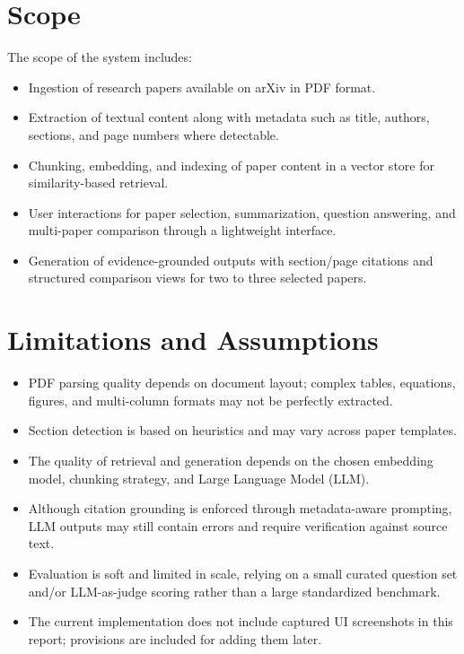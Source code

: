 \section{Scope}
The scope of the system includes:
\begin{itemize}
    \item Ingestion of research papers available on arXiv in PDF format.
    \item Extraction of textual content along with metadata such as title, authors, sections, and page numbers where detectable.
    \item Chunking, embedding, and indexing of paper content in a vector store for similarity-based retrieval.
    \item User interactions for paper selection, summarization, question answering, and multi-paper comparison through a lightweight interface.
    \item Generation of evidence-grounded outputs with section/page citations and structured comparison views for two to three selected papers.
\end{itemize}

\section{Limitations and Assumptions}
\begin{itemize}
    \item PDF parsing quality depends on document layout; complex tables, equations, figures, and multi-column formats may not be perfectly extracted.
    \item Section detection is based on heuristics and may vary across paper templates.
    \item The quality of retrieval and generation depends on the chosen embedding model, chunking strategy, and Large Language Model (LLM).
    \item Although citation grounding is enforced through metadata-aware prompting, LLM outputs may still contain errors and require verification against source text.
    \item Evaluation is soft and limited in scale, relying on a small curated question set and/or LLM-as-judge scoring rather than a large standardized benchmark.
    \item The current implementation does not include captured UI screenshots in this report; provisions are included for adding them later.
\end{itemize}

